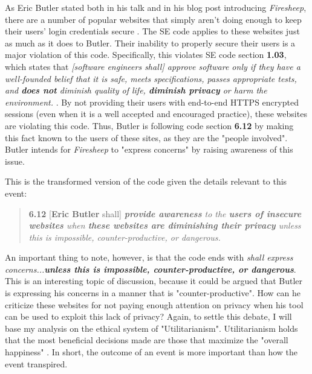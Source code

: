 \documentclass[11pt]{article}
\begin{document}
\begin{multicols}{2}
As Eric Butler stated both in his talk and in his blog post introducing \emph{Firesheep}, there are a number of popular websites that simply aren't doing enough to keep their users' login credentials secure \cite{toorcon_slides} \cite{codebutler_main}. The SE code applies to these websites just as much as it does to Butler. Their inability to properly secure their users is a major violation of this code. Specifically, this violates SE code section \textbf{1.03}, which states that \emph{[software engineers shall] approve software only if they have a well-founded belief that it is safe, meets specifications, passes appropriate tests, and \textbf{does not} diminish quality of life, \textbf{diminish privacy} or harm the environment.} \cite{se_code}. By not providing their users with end-to-end HTTPS encrypted sessions (even when it is a well accepted and encouraged practice), these websites are violating this code. Thus, Butler is following code section \textbf{6.12} by making this fact known to the users of these sites, as they are the "people involved". Butler intends for \emph{Firesheep} to "express concerns" by raising awareness of this issue.

This is the transformed version of the code given the details relevant to this event:

\begin{quote}
  \textbf{6.12} [\textbf{Eric Butler} shall] \emph{\textbf{provide awareness} to the \textbf{users of insecure websites} when \textbf{these websites are diminishing their privacy} unless this is impossible, counter-productive, or dangerous.}
\end{quote}

An important thing to note, however, is that the code ends with \emph{shall express concerns...\textbf{unless this is impossible, counter-productive, or dangerous}}. This is an interesting topic of discussion, because it could be argued that Butler is expressing his concerns in a manner that is "counter-productive". How can he criticize these websites for not paying enough attention on privacy when his tool can be used to exploit this lack of privacy? Again, to settle this debate, I will base my analysis on the ethical system of "Utilitarianism". Utilitarianism holds that the most beneficial decisions made are those that maximize the "overall happiness" \cite{utility}. In short, the outcome of an event is more important than how the event transpired.


\end{multicols}
\end{document}
